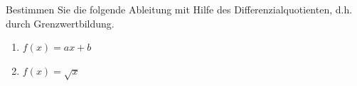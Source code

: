 \begin{ExerciseBlock}
Bestimmen Sie die folgende Ableitung mit Hilfe des Differenzialquotienten, d.h. durch Grenzwertbildung.
\begin{enumerate}[label=\alph*)]
	\item $f(x) = ax + b$
	\item $f(x) = \sqrt{x}$
\end{enumerate}

\end{ExerciseBlock}

